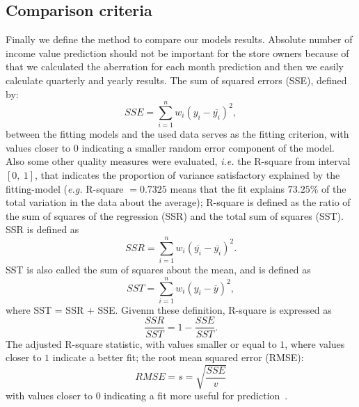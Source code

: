\subsection{Comparison criteria} \label{subsec:result_metodology}
Finally we define the method to compare our models results.
Absolute number of income value prediction should not be important for the store owners because of that we calculated the aberration for each month
prediction and then we easily calculate quarterly and yearly results.
The sum of squared errors (SSE), defined by:
$$SSE = \sum^n_{i=1}w_i(y_i - \overline{y_i})^2,$$
between the fitting models and the used data serves as the fitting criterion,
with values closer to $0$ indicating a smaller random error component of the model.
Also some other quality measures were evaluated, \textit{i.e.} the R-square from interval $[0,\ 1]$,
that indicates the proportion of variance satisfactory explained by the fitting-model (\textit{e.g.}  R-square $= 0.7325$ means
that the fit explains $73.25\%$ of the total variation in the data about the average);
R-square is defined as the ratio of the sum of squares of the regression (SSR) and the total sum of squares (SST).
SSR is defined as
$$SSR = \sum_{i=1}^nw_i(\overline{y_i} - \overline{y_i})^2.$$
SST is also called the sum of squares about the mean, and is defined as
$$SST = \sum_{i=1}^nw_i(y_i - \overline{y})^2,$$
where SST = SSR + SSE. Givenm these definition, R-square is expressed as
$$\frac{SSR}{SST} = 1 - \frac{SSE}{SST}.$$
The adjusted R-square statistic, with values smaller or equal to $1$, where values closer to $1$ indicate a better fit; the root mean squared error (RMSE):\\
$$RMSE = s = \sqrt{\frac{SSE}{v}}$$
with values closer to $0$ indicating a fit more useful for prediction~\cite{cftool}.
